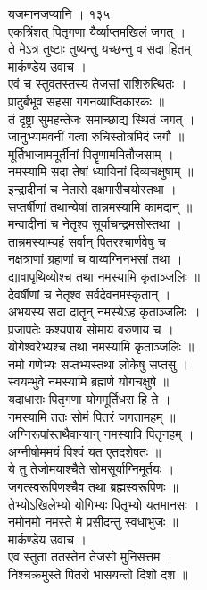 \documentclass[11pt, openany]{book}
\begin{document}
{{{{{{{{{{{{{{{{{{{{{{{{{{ }{ यजमानजप्यानि । १३५}{\\
एकत्रिंशत् पितृगणा यैर्व्याप्तमखिलं जगत् ।\\
ते मेऽत्र तुष्टाः तुष्यन्तु यच्छन्तु व सदा हितम् \textbar{}\textbar{}\\
मार्कण्डेय उवाच ।\\
एवं च स्तुवतस्तस्य तेजसां राशिरुत्थितः ।\\
प्रादुर्बभूव सहसा गगनव्याप्तिकारकः ॥\\
तं दृष्ट्रा सुमहन्तेजः समाच्छाद्य स्थितं जगत् ।\\
जानुभ्यामवनीं गत्वा रुचिस्तोत्रमिदं जगौ ॥\\
मूर्तिभाजाममूर्तीनां पितॄणाममितौजसाम् ।\\
नमस्यामि सदा तेषां ध्यायिनां दिव्यचक्षुषाम् ॥\\
इन्द्रादीनां च नेतारो दक्षमारीचयोस्तथा ।\\
सप्तर्षीणां तथान्येषां तान्नमस्यामि कामदान् ॥\\
मन्वादीनां च नेतृश्व सूर्याचन्द्रमसोस्तथा ।\\
तान्नमस्याम्यहं सर्वान् पितरश्चार्णवेषु च \textbar{}\textbar{}\\
नक्षत्राणां ग्रहाणां च वाय्वग्निनभसां तथा ।\\
द्यावापृथिव्योश्च तथा नमस्यामि कृताञ्जलिः ॥\\
देवर्षीणां च नेतृश्व सर्वदेवनमस्कृतान् ।\\
अभयस्य सदा दातॄन् नमस्येऽह कृताञ्जलिः ॥\\
प्रजापतेः कश्यपाय सोमाय वरुणाय च ।\\
योगेश्वरेभ्यश्च तथा नमस्यामि कृताञ्जलिः ॥\\
नमो गणेभ्यः सप्तभ्यस्तथा लोकेषु सप्तसु ।\\
स्वयम्भुवे नमस्यामि ब्रह्मणे योगचक्षुषे ॥\\
यदाधाराः पितृगणा योगमूर्तिधरा हि ते ।\\
नमस्यामि ततः सोमं पितरं जगतामहम् ॥\\
अग्निरूपांस्तथैवान्यान् नमस्यापि पितृनहम् ।\\
अग्नीषोममयं विश्वं यत एतदशेषतः ॥\\
ये तु तेजोमयाश्चैते सोमसूर्याग्निमूर्तयः ।\\
जगत्स्वरूपिणश्चैव तथा ब्रह्मस्वरूपिणः ॥\\
तेभ्योऽखिलेभ्यो योगिभ्यः पितृभ्यो यतमानसः ।\\
नमोनमो नमस्ते मे प्रसीदन्तु स्वधाभुजः ॥\\
मार्कण्डेय उवाच ।\\
एव स्तुता ततस्तेन तेजसो मुनिसत्तम ।\\
निश्चक्रमुस्ते पितरो भासयन्तो दिशो दश ॥\\


}}}}}}}}}}}}}}}}}}}}}}}}}}
\end{document}
